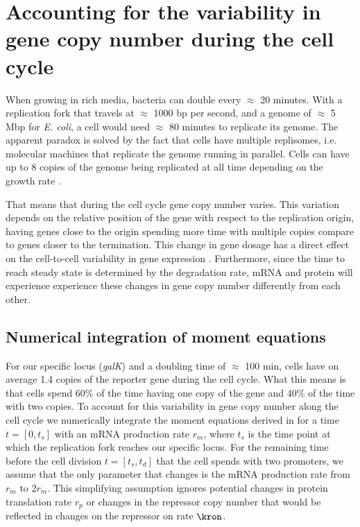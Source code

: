 \label{sec_multi_gene}
\section{Accounting for the variability in gene copy number during the cell
cycle}

When growing in rich media, bacteria can double every $\approx$ 20 minutes. With
a replication fork that travels at $\approx$ 1000 bp per second, and a genome of
$\approx$ 5 Mbp for {\it E. coli}\cite{Moran2010}, a cell would need $\approx$
80 minutes to replicate its genome. The apparent paradox is solved by the fact
that cells have multiple replisomes, i.e. molecular machines that replicate the
genome running in parallel. Cells can have up to 8 copies of the genome being
replicated at all time depending on the growth rate \cite{Bremer1996}.

That means that during the cell cycle gene copy number varies. This variation
depends on the relative position of the gene with respect to the replication
origin, having genes close to the origin spending more time with multiple copies
compare to genes closer to the termination. This change in gene dosage has a
direct effect on the cell-to-cell variability in gene expression
\cite{Jones2014a, Peterson2015}. Furthermore, since the time to reach steady
state is determined by the degradation rate, mRNA and protein will experience
experience these changes in gene copy number differently from each other.

\subsection{Numerical integration of moment equations}

For our specific locus ({\it galK}) and a doubling time of $\approx$ 100 min,
cells have on average 1.4 copies of the reporter gene during the cell cycle.
What this means is that cells spend 60\% of the time having one copy of the gene
and 40\% of the time with two copies. To account for this variability in gene
copy number along the cell cycle we numerically integrate the moment equations
derived in  for a time $t = [0, t_s]$
with an mRNA production rate $r_m$, where $t_s$ is the time point at which the
replication fork reaches our specific locus. For the remaining time before the
cell division $t = [t_s, t_d]$ that the cell spends with two promoters, we
assume that the only parameter that changes is the mRNA production rate from
$r_m$ to $2 r_m$. This simplifying assumption ignores potential changes in
protein translation rate $r_p$ or changes in the repressor copy number that
would be reflected in changes on the repressor on rate $\kron$.

